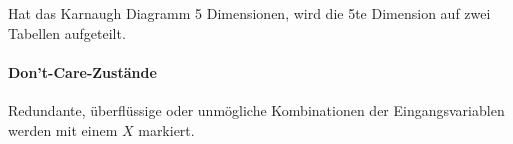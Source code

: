 \begin{center}
\begin{minipage}{0.45\linewidth}
\begin{center}
        \end{center}
    \end{minipage}
\end{center}
{\small Hat das Karnaugh Diagramm 5 Dimensionen, wird die 5te Dimension auf zwei Tabellen aufgeteilt.}
\paragraph{Don't-Care-Zustände} 
Redundante, überflüssige oder unmögliche Kombinationen der Eingangsvariablen werden mit einem \emph{$X$} markiert.

